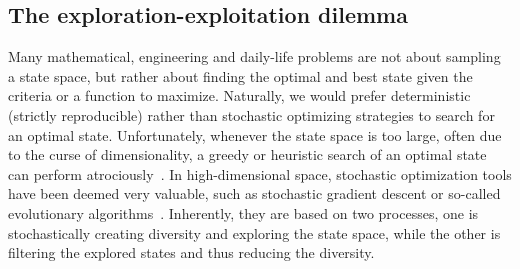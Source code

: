 \subsection{The exploration-exploitation dilemma}
Many mathematical, engineering and daily-life problems are not about sampling a state space, but rather about finding the optimal and best state given the criteria or a function to maximize.
Naturally, we would prefer deterministic (strictly reproducible) rather than stochastic optimizing strategies to search for an optimal state.
Unfortunately, whenever the state space is too large, often due to the curse of dimensionality, a greedy or heuristic search of an optimal state can perform atrociously~\citep{Bellman1966}.
In high-dimensional space, stochastic optimization tools have been deemed very valuable, such as stochastic gradient descent or so-called evolutionary algorithms~\citep{Russell2010,Vikhar2017}.
Inherently, they are based on two processes, one is stochastically creating diversity and exploring the state space, while the other is filtering the explored states and thus reducing the diversity.

